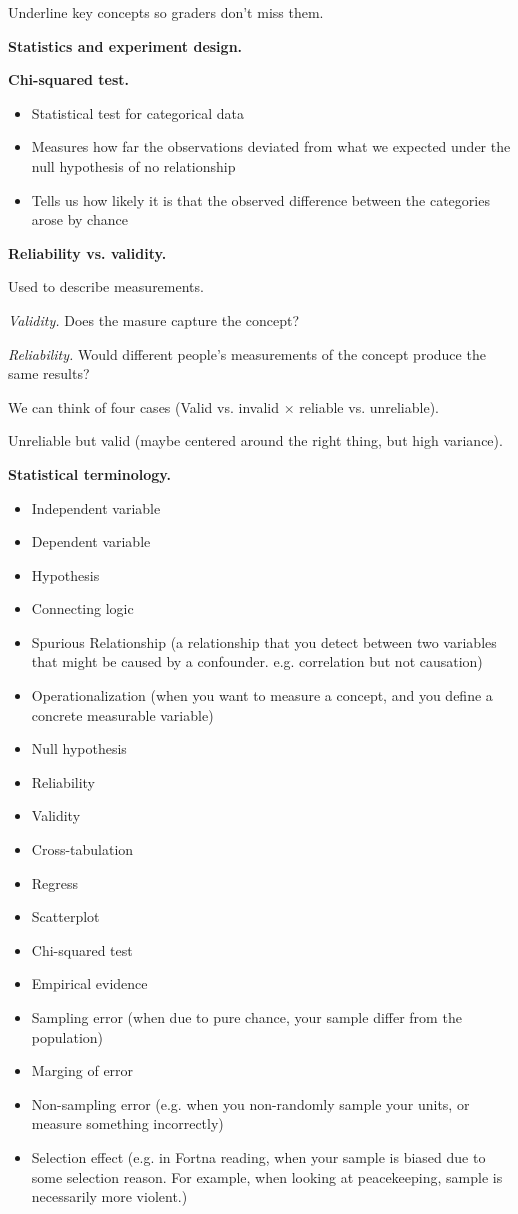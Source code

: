 \documentclass{article}
\begin{document}
Underline key concepts so graders don't miss them.

{\bf Statistics and experiment design.}

{\bf Chi-squared test.}

\begin{itemize}
  \item Statistical test for categorical data
  \item Measures how far the observations deviated from what we expected under the null hypothesis of no relationship
  \item Tells us how likely it is that the observed difference between the categories arose by chance
\end{itemize}

{\bf Reliability vs. validity.}

Used to describe measurements.

{\it Validity.} Does the masure capture the concept?

{\it Reliability.} Would different people's measurements of the concept produce the same results?

We can think of four cases (Valid vs. invalid $\times$ reliable vs. unreliable).

Unreliable but valid (maybe centered around the right thing, but high variance).

{\bf Statistical terminology.}

\begin{itemize}
  \item Independent variable
  \item Dependent variable
  \item Hypothesis
  \item Connecting logic
  \item Spurious Relationship (a relationship that you detect between two variables that might be caused by a confounder. e.g. correlation but not causation)
  \item Operationalization (when you want to measure a concept, and you define a concrete measurable variable)
  \item Null hypothesis
  \item Reliability
  \item Validity
  \item Cross-tabulation
  \item Regress
  \item Scatterplot
  \item Chi-squared test
  \item Empirical evidence
  \item Sampling error (when due to pure chance, your sample differ from the population)
  \item Marging of error
  \item Non-sampling error (e.g. when you non-randomly sample your units, or measure something incorrectly)
  \item Selection effect (e.g. in Fortna reading, when your sample is biased due to some selection reason.  For example, when looking at peacekeeping, sample is necessarily more violent.)
\end{itemize}
\end{document}
